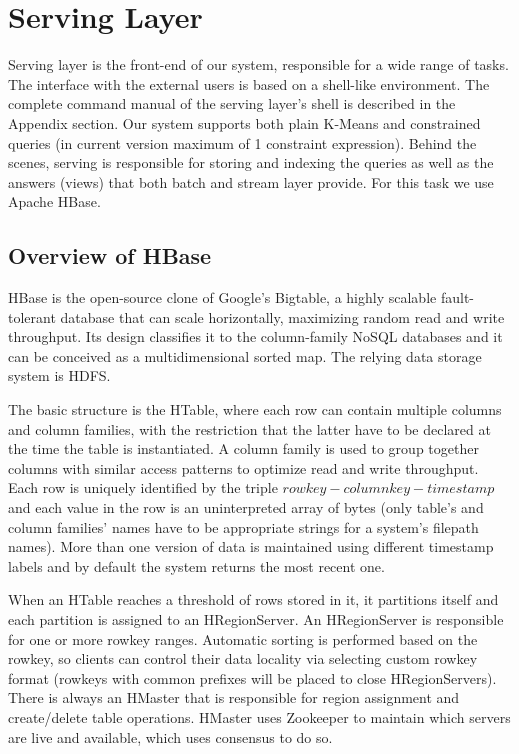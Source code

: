 \documentclass{lmproj}
\begin{document}
\section{Serving Layer}
\label{systemdescr}


Serving layer is the front-end of our system, responsible for a wide range of tasks. The interface with the external users is based on a shell-like environment. The complete command manual of the serving layer's shell is described in the Appendix section. Our system supports both plain K-Means and constrained queries (in current version maximum of 1 constraint expression). Behind the scenes, serving is responsible for storing and indexing the queries as well as the answers (views) that both batch and stream layer provide. For this task we use Apache HBase.

\subsection{Overview of HBase}
HBase is the open-source clone of Google's Bigtable, a highly scalable fault-tolerant database that can scale horizontally, maximizing random read and write throughput. Its design classifies it to the column-family NoSQL databases and it can be conceived as a multidimensional sorted map. The relying data storage system is HDFS.

The basic structure is the HTable, where each row can contain multiple columns and column families, with the restriction that the latter have to be declared at the time the table is instantiated. A column family is used to group together columns with similar access patterns to optimize read and write throughput. Each row is uniquely identified by the triple $row key-column key-timestamp$ and each value in the row is an uninterpreted array of bytes (only table's and column families' names have to be appropriate strings for a system's filepath names). More than one version of data is maintained using different timestamp labels and by default the system returns the most recent one.

When an HTable reaches a threshold of rows stored in it, it partitions itself and each partition is assigned to an HRegionServer. An HRegionServer is responsible for one or more rowkey ranges. Automatic sorting is performed based on the rowkey, so clients can control their data locality via selecting custom rowkey format (rowkeys with common prefixes will be placed to close HRegionServers). There is always an HMaster that is responsible for region assignment and create/delete table operations. HMaster uses Zookeeper to maintain which servers are live and available, which uses consensus to do so.
\end{document}
